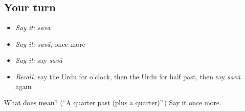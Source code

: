 \subsection*{Your turn}
\begin{itemize}
\raggedright
  \item \emph{Say it:} \emph{savā}
  \item \emph{Say it:} \emph{savā}, once more
  \item \emph{Say it:} say \emph{savā}
  \item \emph{Recall:} say the Urdu for o'clock, then the Urdu for half past, then say \emph{savā} again
\end{itemize}

\begin{tcolorbox}[breakable,colback=teal!4,colframe=teal!35!black,title={Before you move on}]
What does  mean? (\textquotedblleft{}A quarter past (plus a quarter)\textquotedblright{}.) Say it once more.
\end{tcolorbox}
